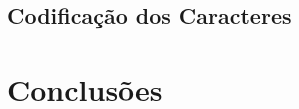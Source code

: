 \documentclass[9pt,a4paper]{extarticle}
\begin{document}
\begin{multicols}{2}
\subsection{Codificação dos Caracteres}\label{sec:encomding}



\section{Conclusões}\label{sec:conclui}






\end{multicols}
\end{document}
